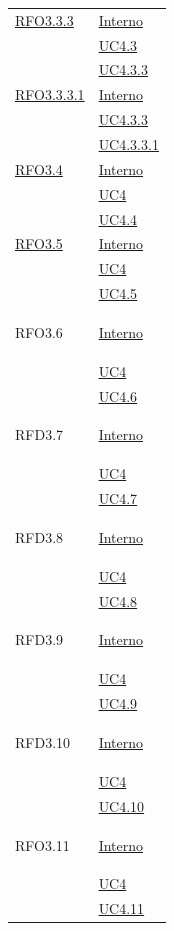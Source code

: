 \begin{longtable}{|>{\centering}m{5cm}|m{5cm}<{\centering}|}
\hyperlink{RFO3.3.3}{RFO3.3.3} & \hyperlink{Interno}{Interno}\\
& \hyperref[UC4.3]{UC4.3}\\
& \hyperref[UC4.3.3]{UC4.3.3}\\ \hline

\hyperlink{RFO3.3.3.1}{RFO3.3.3.1} & \hyperlink{Interno}{Interno}\\
& \hyperref[UC4.3.3]{UC4.3.3}\\
& \hyperref[UC4.3.3.1]{UC4.3.3.1}\\ \hline

\hyperlink{RFO3.4}{RFO3.4} & \hyperlink{Interno}{Interno}\\
& \hyperref[UC4]{UC4}\\
& \hyperref[UC4.4]{UC4.4}\\ \hline

\hyperlink{RFO3.5}{RFO3.5} & \hyperlink{Interno}{Interno}\\
& \hyperref[UC4]{UC4}\\
& \hyperref[UC4.5]{UC4.5}\\ \hline

\hypertarget{RFO3.6}{RFO3.6} & \hyperlink{Interno}{Interno}\\
&\hyperref[UC4]{UC4}\\
&\hyperref[UC4.6]{UC4.6}\\ \hline

\hypertarget{RFD3.7}{RFD3.7} & \hyperlink{Interno}{Interno}\\
& \hyperref[UC4]{UC4}\\
& \hyperref[UC4.7]{UC4.7}\\ \hline

\hypertarget{RFD3.8}{RFD3.8} & \hyperlink{Interno}{Interno}\\
& \hyperref[UC4]{UC4}\\
& \hyperref[UC4.8]{UC4.8}\\ \hline

\hypertarget{RFD3.9}{RFD3.9} & \hyperlink{Interno}{Interno}\\
& \hyperref[UC4]{UC4}\\
& \hyperref[UC4.9]{UC4.9}\\ \hline

\hypertarget{RFD3.10}{RFD3.10} & \hyperlink{Interno}{Interno}\\
& \hyperref[UC4]{UC4}\\
& \hyperref[UC4.10]{UC4.10}\\ \hline

\hypertarget{RFO3.11}{RFO3.11} & \hyperlink{Interno}{Interno}\\
& \hyperref[UC4]{UC4}\\
& \hyperref[UC4.11]{UC4.11}\\ \hline


\end{longtable}
